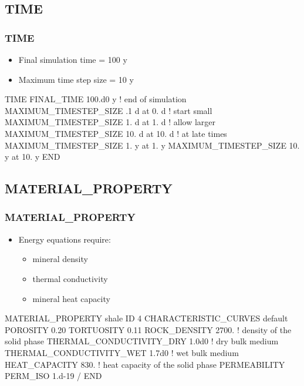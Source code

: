 \documentclass{beamer}
\newcommand\bluecomment[1]{{{\color{blue} #1}}}
\newcommand\greencomment[1]{{{\color{green} #1}}}
\begin{document}
\subsection{TIME}

\begin{frame}[fragile]\frametitle{TIME}
\begin{itemize}
  \item Final simulation time = 100 y
  \item Maximum time step size = 10 y
\end{itemize}

\begin{semiverbatim}

TIME
  FINAL_TIME 100.d0 y \bluecomment{! end of simulation}
  MAXIMUM_TIMESTEP_SIZE .1 d at 0. d \bluecomment{! start small}
  MAXIMUM_TIMESTEP_SIZE 1. d at 1. d \bluecomment{! allow larger}
  MAXIMUM_TIMESTEP_SIZE 10. d at 10. d \bluecomment{! at late times}
  MAXIMUM_TIMESTEP_SIZE 1. y at 1. y
  MAXIMUM_TIMESTEP_SIZE 10. y at 10. y
END
\end{semiverbatim}

\end{frame}

\subsection{MATERIAL\_PROPERTY}

\begin{frame}[fragile]\frametitle{MATERIAL\_PROPERTY}
\begin{itemize}
  \item Energy equations require:
  \begin{itemize}
    \item mineral density
    \item thermal conductivity
    \item mineral heat capacity
  \end{itemize}
\end{itemize}

\begin{semiverbatim}\small
MATERIAL_PROPERTY \greencomment{shale}
  ID 4
  CHARACTERISTIC_CURVES default
  POROSITY 0.20
  TORTUOSITY 0.11
  ROCK_DENSITY 2700. \bluecomment{! density of the solid phase}
  THERMAL_CONDUCTIVITY_DRY 1.0d0 \bluecomment{! dry bulk medium}
  THERMAL_CONDUCTIVITY_WET 1.7d0 \bluecomment{! wet bulk medium}
  HEAT_CAPACITY 830. \bluecomment{! heat capacity of the solid phase}
  PERMEABILITY
    PERM_ISO 1.d-19
  /
END
\end{semiverbatim}
\end{frame}
\end{document}
